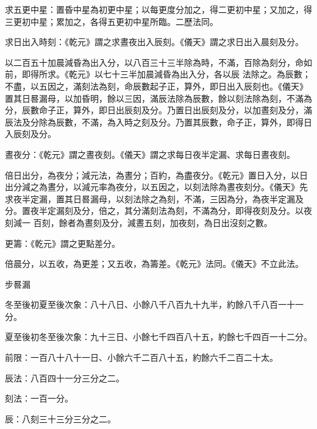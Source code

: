 \begin{pinyinscope}
 求五更中星：置昏中星為初更中星；以每更度分加之，得二更初中星；又加之，得三更初中星；累加之，各得五更初中星所臨。二歷法同。



 求日出入時刻：《乾元》謂之求晝夜出入辰刻。《儀天》謂之求日出入晨刻及分。



 以二百五十加晨減昏為出入分，以八百三十三半除為時，不滿，百除為刻分，命如前，即得所求。《乾元》以七十三半加晨減昏為出入分，各以辰
 法除之。為辰數；不盡，以五因之，滿刻法為刻，命辰數起子正，算外，即日出入辰刻也。《儀天》置其日晷漏母，以加昏明，餘以三因，滿辰法除為辰數，餘以刻法除為刻，不滿為分，辰數命子正，算外，即日出辰刻及分。乃置日出辰刻及分，以加晝刻及分，滿辰法及分除為辰數，不滿，為入時之刻及分。乃置其辰數，命子正，算外，即得日入辰刻及分。



 晝夜分：《乾元》謂之晝夜刻。《儀天》謂之求每日夜半定漏、求每日晝夜刻。



 倍日出分，為夜分；減元法，為晝分；百約，為盡夜分。《乾元》置日入分，以日出分減之為晝分，以減元率為夜分，以五因之，以刻法除為晝夜刻分。《儀天》先求夜半定漏，置其日晷漏母，以刻法除之為刻，不滿，三因為分，為夜半定漏及分。置夜半定漏刻及分，倍之，其分滿刻法為刻，不滿為分，即得夜刻及分。以夜刻減一
 百刻，餘者為晝刻及分，減晝五刻，加夜刻，為日出沒刻之數。



 更籌：《乾元》謂之更點差分。



 倍晨分，以五收，為更差；又五收，為籌差。《乾元》法同。《儀天》不立此法。



 步晷漏



 冬至後初夏至後次象：八十八日、小餘八千八百九十九半，約餘八千八百一十一分。



 夏至後初冬至後次象：九十三日、小餘七千四百八十五，約餘七千四百一十二分。



 前限：一百八十八十一日、小餘六千二百八十五，約餘六千二百二十太。



 辰法：八百四十一分三分之二。



 刻法：一百一分。



 辰：八刻三十三分三分之二。




\end{pinyinscope}
